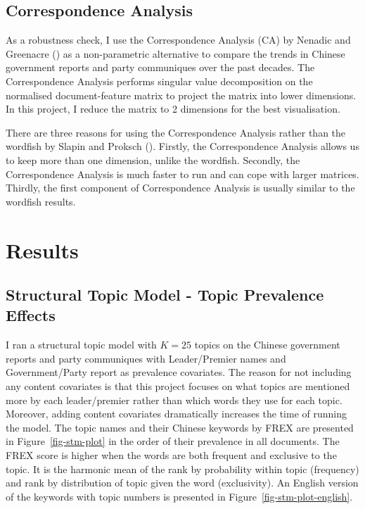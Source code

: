 \documentclass[
  letterpaper,
  abstract=true]{scrartcl}
\begin{document}
\subsection{Correspondence Analysis}\label{correspondence-analysis}

As a robustness check, I use the Correspondence Analysis (CA) by Nenadic
and Greenacre () as a non-parametric
alternative to compare the trends in Chinese government reports and
party communiques over the past decades. The Correspondence Analysis
performs singular value decomposition on the normalised document-feature
matrix to project the matrix into lower dimensions. In this project, I
reduce the matrix to 2 dimensions for the best visualisation.

There are three reasons for using the Correspondence Analysis rather
than the wordfish by Slapin and Proksch
(). Firstly, the Correspondence Analysis
allows us to keep more than one dimension, unlike the wordfish.
Secondly, the Correspondence Analysis is much faster to run and can cope
with larger matrices. Thirdly, the first component of Correspondence
Analysis is usually similar to the wordfish results.

\section{Results}\label{results}

\subsection{Structural Topic Model - Topic Prevalence
Effects}\label{structural-topic-model---topic-prevalence-effects}

I ran a structural topic model with \(K=25\) topics on the Chinese
government reports and party communiques with Leader/Premier names and
Government/Party report as prevalence covariates. The reason for not
including any content covariates is that this project focuses on what
topics are mentioned more by each leader/premier rather than which words
they use for each topic. Moreover, adding content covariates
dramatically increases the time of running the model. The topic names
and their Chinese keywords by FREX are presented in
Figure~\ref{fig-stm-plot} in the order of their prevalence in all
documents. The FREX score is higher when the words are both frequent and
exclusive to the topic. It is the harmonic mean of the rank by
probability within topic (frequency) and rank by distribution of topic
given the word (exclusivity). An English version of the keywords with
topic numbers is presented in Figure~\ref{fig-stm-plot-english}.
\end{document}

